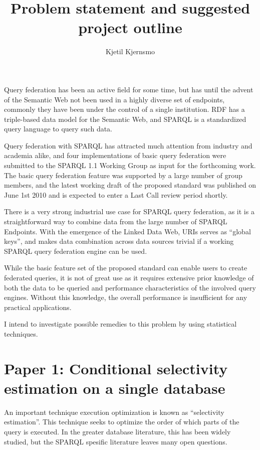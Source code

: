 \documentclass[a4paper,english,10pt]{article}
\title{Problem statement and suggested project outline}
\author{Kjetil Kjernsmo}
\begin{document}
\maketitle


Query federation has been an active field for some time, but has until
the advent of the Semantic Web not been used in a highly diverse set
of endpoints, commonly they have been under the control of a single
institution. RDF has a triple-based data model for the Semantic Web,
and SPARQL is a standardized query language to query such data.

Query federation with SPARQL has attracted much attention
from industry and academia alike, and four implementations of basic
query federation were submitted to the SPARQL 1.1 Working Group as
input for the forthcoming work. The basic query federation feature was
supported by a large number of group members, and the latest working
draft of the proposed standard was published on June 1st 2010 and is
expected to enter a Last Call review period shortly.

There is a very strong industrial use case for SPARQL query
federation, as it is a straightforward way to combine data from the
large number of SPARQL Endpoints. With the emergence of the Linked
Data Web, URIs serves as ``global keys'', and makes data combination
across data sources trivial if a working SPARQL query federation
engine can be used.

While the basic feature set of the proposed standard can enable users
to create federated queries, it is not of great use as it requires
extensive prior knowledge of both the data to be queried and
performance characteristics of the involved query engines. Without
this knowledge, the overall performance is insufficient for any
practical applications.

I intend to investigate possible remedies to this problem by using
statistical techniques. 

\section*{Paper 1: Conditional selectivity estimation on a single database}


An important technique execution optimization is known as
``selectivity estimation''. This technique seeks to optimize the order
of which parts of the query is executed. In the greater database
literature, this has been widely studied, but the SPARQL spesific
literature leaves many open questions.
\end{document}
